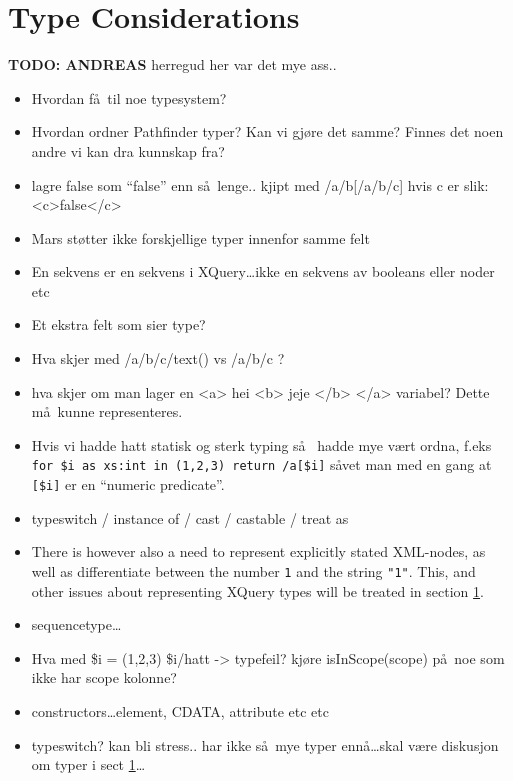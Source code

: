 \section{Type Considerations}
\label{sect:disc:typeSystem}
\textbf{\LARGE TODO: {ANDREAS}}
herregud her var det mye ass..
\begin{itemize}
  \item Hvordan f\aa~til noe typesystem?
  \item Hvordan ordner Pathfinder typer? Kan vi gj\o re det samme? Finnes det noen andre vi kan dra kunnskap fra?
  \item lagre false som ``false'' enn s\aa~lenge.. kjipt med /a/b[/a/b/c] hvis c er slik: <c>false</c>
  \item Mars st\o tter ikke forskjellige typer innenfor samme felt
  \item En sekvens er en sekvens i XQuery\ldots ikke en sekvens av booleans
  eller noder etc
  \item Et ekstra felt som sier type?
  \item Hva skjer med /a/b/c/text() vs /a/b/c ?
  \item hva skjer om man lager en <a> hei <b> jeje </b> </a> variabel? Dette
  m\aa~kunne representeres.
  \item Hvis vi hadde hatt statisk og sterk typing s\aa~ hadde mye v\ae rt
  ordna, f.eks \verb!for $i as xs:int in (1,2,3) return /a[$i]! s\aa vet man
  med en gang at \verb![$i]! er en ``numeric predicate''.
  \item typeswitch / instance of / cast / castable / treat as
  \item There is however also a need to represent explicitly stated XML-nodes, as well
	as differentiate between the number \texttt{1} and the string \texttt{"1"}.
	This, and other issues about representing XQuery types will be treated in
	section \ref{sect:disc:typeSystem}.
	\item sequencetype\ldots  
\item Hva med \$i = (1,2,3) \$i/hatt -> typefeil? kj\o re isInScope(scope) p\aa~noe som ikke har scope kolonne?
  		\item constructors\ldots element, CDATA, attribute etc etc
  		\item typeswitch? kan bli stress.. har ikke s\aa~mye typer enn\aa \ldots skal v\ae re diskusjon om typer i
  		sect \ref{sect:disc:typeSystem}\ldots
	\end{itemize}